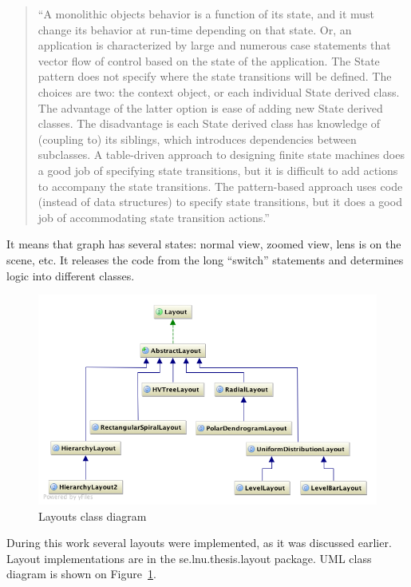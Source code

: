 \begin{quotation}
``A monolithic objects behavior is a function of its state, and it must change its behavior at run-time depending on that state.
Or, an application is characterized by large and numerous case statements that vector flow of control based on the state
of the application. The State pattern does not specify where the state transitions will be defined. The choices are two:
the context object, or each individual State derived class.
The advantage of the latter option is ease of adding new State derived classes.
The disadvantage is each State derived class has knowledge of (coupling to) its siblings,
which introduces dependencies between subclasses.
A table-driven approach to designing finite state machines does a good job of specifying state transitions,
but it is difficult to add actions to accompany the state transitions. The pattern-based approach uses code
(instead of data structures) to specify state transitions,
but it does a good job of accommodating state transition actions.''~\cite{STATE}
\end{quotation}

It means that graph has several states: normal view, zoomed view, lens is on the scene, etc.
It releases the code from the long ``switch'' statements  and determines logic into different classes.

\begin{figure}[h!]
\centering
\includegraphics[scale=0.55]{pictures/uml_layouts.png}
\caption{Layouts class diagram}
\label{fig:uml_layouts}
\end{figure}


During this work several layouts were implemented, as it was discussed earlier.
Layout implementations are in the \textsf{se.lnu.thesis.layout} package. UML class diagram is shown on Figure~\ref{fig:uml_layouts}.